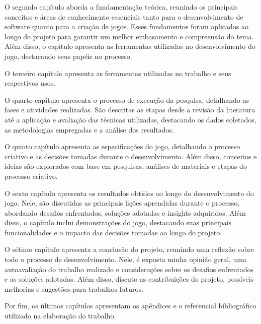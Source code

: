 O segundo capítulo aborda a fundamentação teórica, reunindo os principais conceitos e áreas de conhecimento essenciais tanto para o desenvolvimento de software quanto para a criação de jogos. Esses fundamentos foram aplicados ao longo do projeto para garantir um melhor embasamento e compreensão do tema. Além disso, o capítulo apresenta as ferramentas utilizadas no desenvolvimento do jogo, destacando seus papéis no processo.

O terceiro capítulo apresenta as ferramentas utilizadas no trabalho e seus respectivos usos.

O quarto capítulo apresenta o processo de execução da pesquisa, detalhando as fases e atividades realizadas. São descritas as etapas desde a revisão da literatura até a aplicação e avaliação das técnicas utilizadas, destacando os dados coletados, as metodologias empregadas e a análise dos resultados.

O quinto capítulo apresenta as especificações do jogo, detalhando o processo criativo e as decisões tomadas durante o desenvolvimento. Além disso, conceitos e ideias são explorados com base em pesquisas, análises de materiais e etapas do processo criativo.

O sexto capítulo apresenta os resultados obtidos ao longo do desenvolvimento do jogo. Nele, são discutidas as principais lições aprendidas durante o processo, abordando desafios enfrentados, soluções adotadas e insights adquiridos. Além disso, o capítulo inclui demonstrações do jogo, destacando suas principais funcionalidades e o impacto das decisões tomadas ao longo do projeto.

O sétimo capítulo apresenta a conclusão do projeto, reunindo uma reflexão sobre todo o processo de desenvolvimento. Nele, é exposta minha opinião geral, uma autoavaliação do trabalho realizado e considerações sobre os desafios enfrentados e as soluções adotadas. Além disso, discuto as contribuições do projeto, possíveis melhorias e sugestões para trabalhos futuros.

Por fim, os últimos capítulos apresentam os apêndices e o referencial bibliográfico utilizado na elaboração do trabalho.
